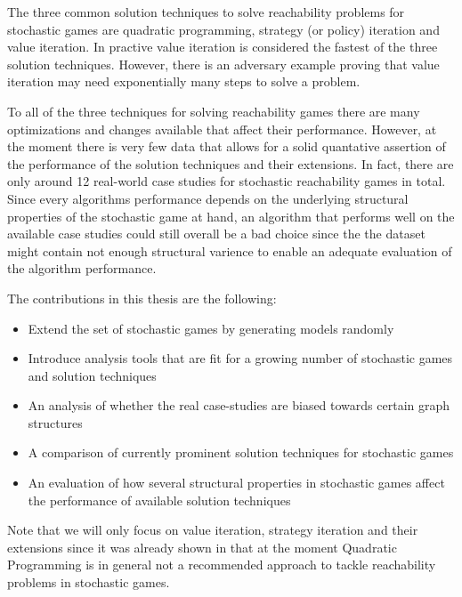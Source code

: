 The three common solution techniques to solve reachability problems for stochastic games are quadratic programming, strategy (or policy) iteration and value iteration.
In practive value iteration is considered the fastest of the three solution techniques.
However, there is an adversary example \cite{haddadmonmege} proving that value iteration may need exponentially many steps to solve a problem.


To all of the three techniques for solving reachability games there are many optimizations and changes available that affect their performance.
However, at the moment there is very few data that allows for a solid quantative assertion of the performance of the solution techniques and their extensions.
In fact, there are only around 12 real-world case studies for stochastic reachability games in total.
Since every algorithms performance depends on the underlying structural properties of the stochastic game at hand, 
an algorithm that performs well on the available case studies could still overall be a bad choice since the the dataset might contain not enough
structural varience to enable an adequate evaluation of the algorithm performance.

The contributions in this thesis are the following:
\begin{itemize}
    \item Extend the set of stochastic games by generating models randomly
    \item Introduce analysis tools that are fit for a growing number of stochastic games and solution techniques
    \item An analysis of whether the real case-studies are biased towards certain graph structures
    \item A comparison of currently prominent solution techniques for stochastic games
    \item An evaluation of how several structural properties in stochastic games affect the performance of available solution techniques
\end{itemize}

Note that we will only focus on value iteration, strategy iteration and their extensions since it was already shown in \cite{Gandalf} that at the moment
Quadratic Programming is in general not a recommended approach to tackle reachability problems in stochastic games.


